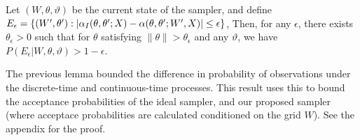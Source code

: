 \begin{proposition}
Let $(W, \theta, \vartheta)$ be the current state of the sampler, and 
define $E_\epsilon = \{(W', \theta'): 
|\alpha_I(\theta,\theta';X) - \alpha(\theta,\theta';W',X)| \le \epsilon\}$,
Then, for any $\epsilon$, there exists $\theta_\epsilon > 0$ 
 such that for $\theta$ satisfying $\| \theta \| > \theta_\epsilon$ and any $\vartheta$, we have
$P(E_\epsilon|W,\theta,\vartheta) > 1-\epsilon$.
\label{prop:mix0}
\end{proposition}
The previous lemma bounded the difference in probability of observations 
under the discrete-time and continuous-time processes. This result 
uses this to bound the acceptance probabilities of the ideal sampler, 
and our proposed sampler (where acceptace probabilities are calculated 
conditioned on the grid $W$). See the appendix for the proof.

